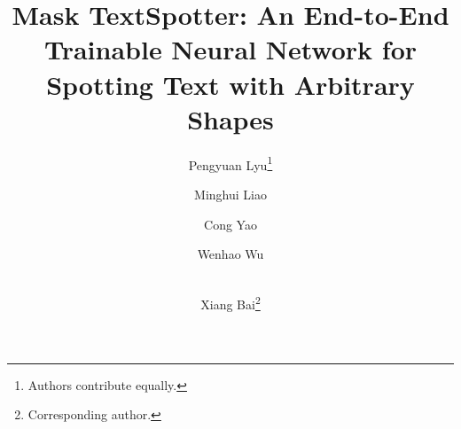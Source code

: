 \documentclass[runningheads]{llncs}
\makeatletter
\newcommand{\printfnsymbol}[1]{%
  \textsuperscript{\@fnsymbol{#1}}%
}
\makeatother
\begin{document}
%
\title{Mask TextSpotter: An End-to-End Trainable Neural Network for Spotting Text with Arbitrary Shapes} 

%
\author{Pengyuan Lyu\thanks{Authors contribute equally.} \and
Minghui Liao\printfnsymbol{1} \and
Cong Yao \and
Wenhao Wu \and \\
Xiang Bai\thanks{Corresponding author.}}
%
%
\end{document}
